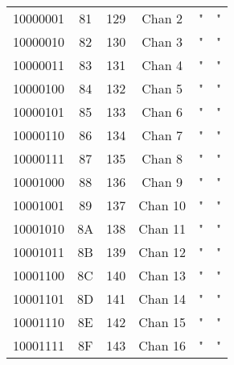 \begin{center}
\begin{supertabular}{| c | c | c | c | c | c |}
                10000001 & 81 & 129 & Chan 2   &                   "                    &                    "                       \\
             10000010 & 82 & 130 & Chan 3   &                   "                    &                    "                       \\
                10000011 & 83 & 131 & Chan 4   &                   "                    &                    "                       \\
             10000100 & 84 & 132 & Chan 5   &                   "                    &                    "                       \\
                10000101 & 85 & 133 & Chan 6   &                   "                    &                    "                       \\
             10000110 & 86 & 134 & Chan 7   &                   "                    &                    "                       \\
                10000111 & 87 & 135 & Chan 8   &                   "                    &                    "                       \\
             10001000 & 88 & 136 & Chan 9   &                   "                    &                    "                       \\
                10001001 & 89 & 137 & Chan 10  &                   "                    &                    "                       \\
             10001010 & 8A & 138 & Chan 11  &                   "                    &                    "                       \\
                10001011 & 8B & 139 & Chan 12  &                   "                    &                    "                       \\
             10001100 & 8C & 140 & Chan 13  &                   "                    &                    "                       \\
                10001101 & 8D & 141 & Chan 14  &                   "                    &                    "                       \\
             10001110 & 8E & 142 & Chan 15  &                   "                    &                    "                       \\
                10001111 & 8F & 143 & Chan 16  &                   "                    &                    "                       \\
        \end{supertabular}
        \end{center}
        
